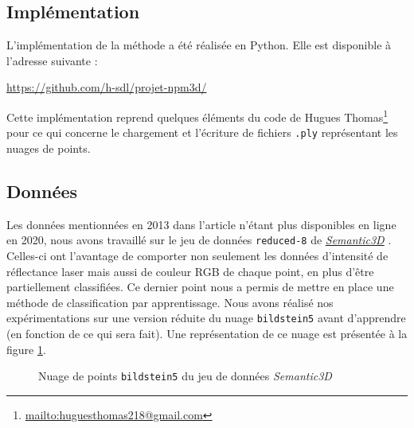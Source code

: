 \documentclass[a4paper, onecolumn, 11pt]{article}
\newcommand{\TODO}{\fbox{\textcolor{red}{TODO}}}
\begin{document}
\subsection{Implémentation}
L'implémentation de la méthode a été réalisée en Python. Elle est disponible à l'adresse suivante :

\begin{center}
	\url{https://github.com/h-sdl/projet-npm3d/} 
\end{center}

Cette implémentation reprend quelques éléments du code de Hugues Thomas\footnote{\url{mailto:huguesthomas218@gmail.com}} pour ce qui concerne le chargement et l'écriture de fichiers \texttt{.ply} représentant les nuages de points.

\subsection{Données}
Les données mentionnées en 2013 dans l'article \cite{aka_article} n'étant plus disponibles en ligne en 2020, nous avons travaillé sur le jeu de données \texttt{reduced-8} de \href{http://www.semantic3d.net/}{\emph{Semantic3D}} \cite{hackel2017isprs}. Celles-ci ont l'avantage de comporter non seulement les données d'intensité de réflectance laser mais aussi de couleur RGB de chaque point, en plus d'être partiellement classifiées. Ce dernier point nous a permis de mettre en place une méthode de classification par apprentissage.
Nous avons réalisé nos expérimentations sur une version réduite du nuage \texttt{bildstein5} avant d'apprendre (\TODO en fonction de ce qui sera fait).
Une représentation de ce nuage est présentée à la figure \ref{tomate}.

\begin{figure}[h]
\caption{Nuage de points \texttt{bildstein5} du jeu de données \emph{Semantic3D}}
\label{tomate}
\end{figure}

\nocite{*}


\end{document}
